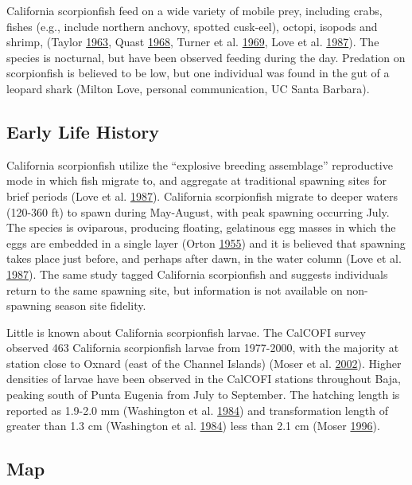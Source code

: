 \documentclass[12pt,]{article}
\begin{document}
California scorpionfish feed on a wide variety of mobile prey, including
crabs, fishes (e.g., include northern anchovy, spotted cusk-eel),
octopi, isopods and shrimp, (Taylor
\protect\hyperlink{ref-Taylor1963}{1963}, Quast
\protect\hyperlink{ref-Quast1968}{1968}, Turner et al.
\protect\hyperlink{ref-Turner1969}{1969}, Love et al.
\protect\hyperlink{ref-Love1987}{1987}). The species is nocturnal, but
have been observed feeding during the day. Predation on scorpionfish is
believed to be low, but one individual was found in the gut of a leopard
shark (Milton Love, personal communication, UC Santa Barbara).

\subsection{Early Life History}\label{early-life-history}

California scorpionfish utilize the ``explosive breeding assemblage''
reproductive mode in which fish migrate to, and aggregate at traditional
spawning sites for brief periods (Love et al.
\protect\hyperlink{ref-Love1987}{1987}). California scorpionfish migrate
to deeper waters (120-360 ft) to spawn during May-August, with peak
spawning occurring July. The species is oviparous, producing floating,
gelatinous egg masses in which the eggs are embedded in a single layer
(Orton \protect\hyperlink{ref-Orton1955}{1955}) and it is believed that
spawning takes place just before, and perhaps after dawn, in the water
column (Love et al. \protect\hyperlink{ref-Love1987}{1987}). The same
study tagged California scorpionfish and suggests individuals return to
the same spawning site, but information is not available on non-spawning
season site fidelity.

Little is known about California scorpionfish larvae. The CalCOFI survey
observed 463 California scorpionfish larvae from 1977-2000, with the
majority at station close to Oxnard (east of the Channel Islands) (Moser
et al. \protect\hyperlink{ref-Moser2002}{2002}). Higher densities of
larvae have been observed in the CalCOFI stations throughout Baja,
peaking south of Punta Eugenia from July to September. The hatching
length is reported as 1.9-2.0 mm (Washington et al.
\protect\hyperlink{ref-Washington1984}{1984}) and transformation length
of greater than 1.3 cm (Washington et al.
\protect\hyperlink{ref-Washington1984}{1984}) less than 2.1 cm (Moser
\protect\hyperlink{ref-Moser1996}{1996}).

\subsection{Map}\label{map}
\end{document}
